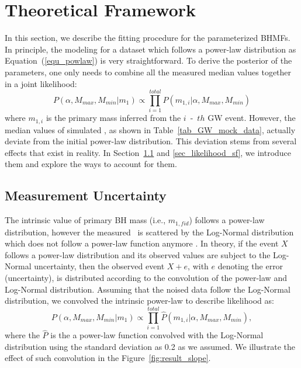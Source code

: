 \documentclass[twocolumn]{aastex62}
\begin{document}
\section{Theoretical Framework}  \label{sec_theory}
In this section, we describe the fitting procedure for the parameterized BHMFs. 
In principle, the modeling for a dataset which follows a power-law distribution as Equation~(\ref{equ_powlaw}) is very straightforward. To derive the posterior of the parameters, one only needs to combine all the measured median values together in a joint likelihood:
 \begin{equation} \label{equ_lik_powlaw}
 P(\alpha, M_{max}, M_{min}|m_{1}) \propto  \prod_{i=1}^{total} P(m_{1,i}|\alpha, M_{max}, M_{min})
 \end{equation}
 where $m_{1,i}$ is the primary mass inferred from the $i$~-~$th$ GW event.
However, the median values of simulated \mone, as shown in Table~\ref{tab_GW_mock_data}, actually deviate from the initial power-law distribution. This deviation stems from several effects that exist in reality. In Section~\ref{sec_likelihood_noise} and \ref{sec_likelihood_sf}, we introduce them and explore the ways to account for them.

\subsection{Measurement Uncertainty}\label{sec_likelihood_noise}
The intrinsic value of primary BH mass (i.e., $m_{1,fid}$) follows a power-law distribution, however the measured  \mone\ is scattered by the Log-Normal distribution which does not follow a power-law function anymore \citep{Koen2009}. In theory, if the event $X$ follows a power-law distribution and its observed values are subject to the  Log-Normal uncertainty, then the observed event $X + e$,   with $e$ denoting the error (uncertainty), is distributed according to the convolution of the power-law and Log-Normal distribution. Assuming that the noised data follow the Log-Normal distribution, we convolved the intrinsic power-law to describe likelihood as:
 \begin{equation} \label{equ_lik_conv}
 P(\alpha, M_{max}, M_{min}|m_{1}) \propto  \prod_{i=1}^{total} \hat{P}(m_{1,i}|\alpha, M_{max}, M_{min}),
 \end{equation}
where the $\hat{P}$ is the a power-law function convolved with the Log-Normal distribution using the standard deviation as 0.2 as we assumed. We illustrate the effect of such convolution in the Figure~\ref{fig:result_slope}.
\end{document}
